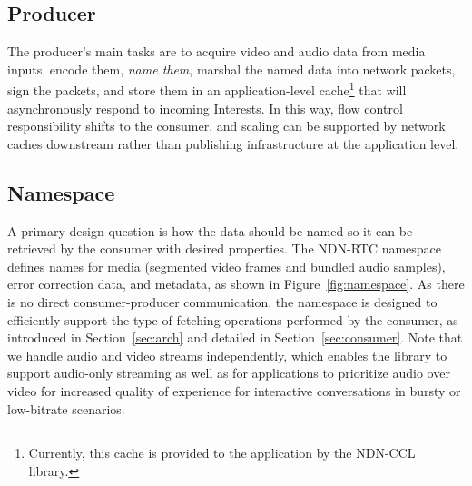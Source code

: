 \documentclass{icn/sig-alternate-2013} %
\newcommand{\ndnrtcName}{NDN-RTC} %
\begin{document}

\subsection{Producer}
The producer's main tasks are to acquire video and audio data from media inputs, encode them, \textit{name them}, marshal the named data into network packets, sign the packets, and store them in an application-level cache\footnote{Currently, this cache is provided to the application by the NDN-CCL library.} that will asynchronously respond to incoming Interests. In this way, flow control responsibility shifts to the consumer, and scaling can be supported by network caches downstream rather than publishing infrastructure at the application level.  

\subsection{Namespace}

A primary design question is how the data should be named so it can be retrieved by the consumer with desired properties. The \ndnrtcName{} namespace defines names for media (segmented video frames and bundled audio samples), error correction data, and metadata, as shown in Figure~\ref{fig:namespace}.  As there is no direct consumer-producer communication, the namespace is designed to efficiently support the type of fetching operations performed by the consumer, as introduced in Section~\ref{sec:arch} and detailed in Section~\ref{sec:consumer}.   Note that we handle audio and video streams independently, which enables the library to support audio-only streaming as well as for applications to prioritize audio over video for increased quality of experience for interactive conversations in bursty or low-bitrate scenarios.  
\end{document}
